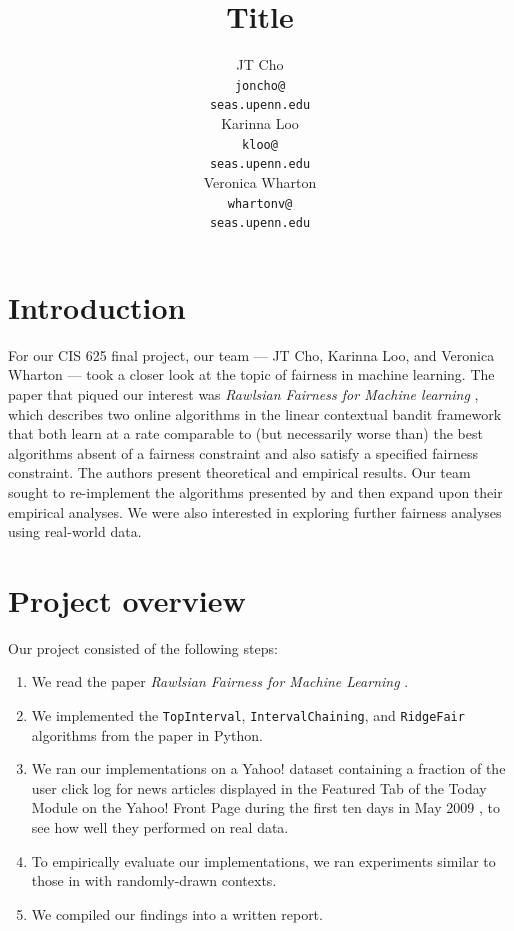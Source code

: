 \documentclass[11pt]{article}
\title{Title}
\author{JT Cho \\
	{\tt joncho@} \\
	{\tt seas.upenn.edu} \\\And
	Karinna Loo \\
	{\tt kloo@} \\
	{\tt seas.upenn.edu} \\\And
  	Veronica Wharton \\
  	{\tt whartonv@} \\
	{\tt seas.upenn.edu} }
\date{}
\begin{document}
\maketitle




\section{Introduction}

For our CIS 625 final project, our team --- JT Cho, Karinna Loo, and Veronica Wharton --- took a closer look at the topic of fairness in machine learning. The paper that piqued our interest was \textit{Rawlsian Fairness for Machine learning} \cite{DBLP:journals/corr/JosephKMNR16}, which describes two online algorithms in the linear contextual bandit framework that both learn at a rate comparable to (but necessarily worse than) the best algorithms absent of a fairness constraint and also satisfy a specified fairness constraint. The authors present theoretical and empirical results. Our team sought to re-implement the algorithms presented by  and then expand upon their empirical analyses. We were also interested in exploring further fairness analyses using real-world data.

\section{Project overview}

Our project consisted of the following steps:

\begin{enumerate}
	\item We read the paper \textit{Rawlsian Fairness for Machine Learning}  \cite{DBLP:journals/corr/JosephKMNR16}.
	\item We implemented the \texttt{TopInterval}, \texttt{IntervalChaining}, and \texttt{RidgeFair} algorithms from the paper in Python. 
	\item We ran our implementations on a Yahoo! dataset containing a fraction of the user click log for news articles displayed in the Featured Tab of the Today Module on the Yahoo! Front Page during the first ten days in May 2009 \cite{yahoo}, to see how well they performed on real data.
	\item To empirically evaluate our implementations, we ran experiments similar to those in \cite{DBLP:journals/corr/JosephKMNR16} with randomly-drawn contexts. 
	\item We compiled our findings into a written report.
\end{enumerate}
\end{document}
